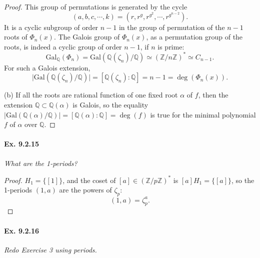 \documentclass[11pt,a4paper]{article}
\newcommand{\Q}{\mathbb{Q}}
\newcommand{\Z}{\mathbb{Z}}
\newcommand{\Gal}{\mathrm{Gal}}
\begin{document}
\begin{proof}
This group of permutations is generated by the cycle $$(a,b,c,\cdots,k) = (r,r^g,r^{g^2}, \cdots,r^{g^{n-2}}).$$ It is a cyclic subgroup of order $n-1$ in the group of permutation of the $n-1$ roots of $\Phi_n(x)$. The Galois group of $\Phi_n(x)$, as a permutation group of the roots, is indeed a cyclic group of order $n-1$, if $n$ is prime: 
$$\Gal_{\Q}(\Phi_n) = \Gal(\Q(\zeta_n)/\Q) \simeq (\Z/n\Z)^* \simeq C_{n-1}.$$
For such a Galois extension,
$$\vert \Gal(\Q(\zeta_n)/\Q) \vert = [\Q(\zeta_n):\Q] = n-1 = \deg(\Phi_n(x)).$$

\item[(b)] If all the roots are rational function of one fixed root $\alpha$ of $f$, then the extension $\Q \subset \Q(\alpha)$ is Galois, so  the equality $\vert \Gal(\Q(\alpha)/\Q) \vert = [\Q(\alpha) : \Q]  = \deg(f)$ is true for the minimal polynomial $f$ of $\alpha$ over $\Q$.
\end{proof}

\paragraph{Ex. 9.2.15}

{\it What are the 1-periods?
}

\begin{proof}
$H_1 = \{[1]\}$, and the coset of $[a] \in (\Z/p\Z)^*$ is $[a]H_{1} = \{[a]\}$, so  the 1-periods $(1,a)$ are the powers of $\zeta_p$: $$(1,a) = \zeta_p^a.$$
\end{proof}

\paragraph{Ex. 9.2.16}

{\it Redo Exercise 3 using periods.
}
\end{document}
